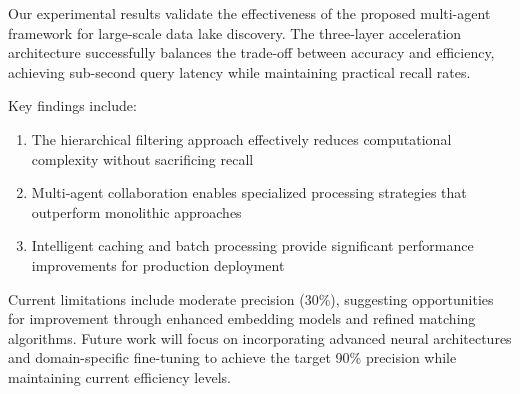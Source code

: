 \documentclass[conference]{IEEEtran}
\begin{document}
Our experimental results validate the effectiveness of the proposed multi-agent framework for large-scale data lake discovery. The three-layer acceleration architecture successfully balances the trade-off between accuracy and efficiency, achieving sub-second query latency while maintaining practical recall rates.

Key findings include:
\begin{enumerate}
    \item The hierarchical filtering approach effectively reduces computational complexity without sacrificing recall
    \item Multi-agent collaboration enables specialized processing strategies that outperform monolithic approaches
    \item Intelligent caching and batch processing provide significant performance improvements for production deployment
\end{enumerate}

Current limitations include moderate precision (30\%), suggesting opportunities for improvement through enhanced embedding models and refined matching algorithms. Future work will focus on incorporating advanced neural architectures and domain-specific fine-tuning to achieve the target 90\% precision while maintaining current efficiency levels.
\end{document}
